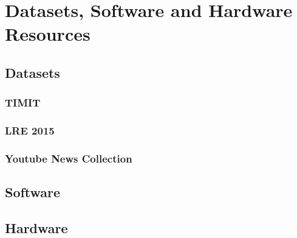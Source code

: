 \section{Datasets, Software and Hardware Resources}

\subsection{Datasets}

\subsubsection{TIMIT}
\subsubsection{LRE 2015}
\subsubsection{Youtube News Collection}

\subsection{Software}
\subsection{Hardware}
